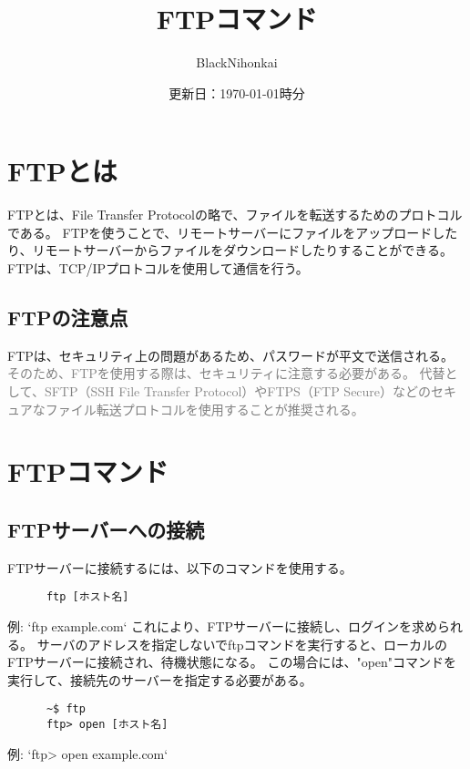 \documentclass[a4paper,10pt]{jsarticle}
\title{FTPコマンド}
\author{BlackNihonkai}
\date{更新日：\today  \the\hour 時\the\minute 分}
\begin{document}
\maketitle



\section{FTPとは}
    FTPとは、File Transfer Protocolの略で、ファイルを転送するためのプロトコルである。
    FTPを使うことで、リモートサーバーにファイルをアップロードしたり、リモートサーバーからファイルをダウンロードしたりすることができる。
    FTPは、TCP/IPプロトコルを使用して通信を行う。
  \subsection{FTPの注意点}
    FTPは、セキュリティ上の問題があるため、パスワードが平文で送信される。\\
    \textcolor{grey}{そのため、FTPを使用する際は、セキュリティに注意する必要がある。
    代替として、SFTP（SSH File Transfer Protocol）やFTPS（FTP Secure）などのセキュアなファイル転送プロトコルを使用することが推奨される。}

\section{FTPコマンド}
  \subsection{FTPサーバーへの接続}
    FTPサーバーに接続するには、以下のコマンドを使用する。
    \begin{lstlisting}
      ftp [ホスト名]
    \end{lstlisting}
    例: `ftp example.com`
    これにより、FTPサーバーに接続し、ログインを求められる。
    サーバのアドレスを指定しないでftpコマンドを実行すると、ローカルのFTPサーバーに接続され、待機状態になる。
    この場合には、"open"コマンドを実行して、接続先のサーバーを指定する必要がある。  
    \begin{lstlisting}
      ~$ ftp
      ftp> open [ホスト名]
    \end{lstlisting}
    例: `ftp> open example.com` 
\end{document}
